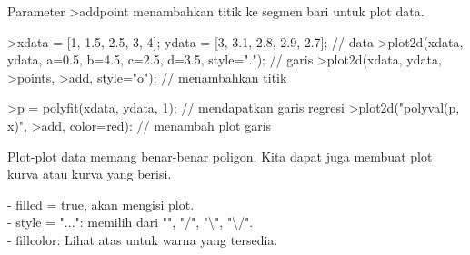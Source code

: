 \documentclass[a4paper,10pt]{article}
\begin{document}
\begin{eulernotebook}
\begin{eulercomment}
\begin{eulercomment}
\begin{eulercomment}
\begin{eulercomment}
\begin{eulercomment}
Parameter \textgreater{}addpoint menambahkan titik ke segmen bari untuk plot data.
\end{eulercomment}
\begin{eulerprompt}
>xdata = [1, 1.5, 2.5, 3, 4]; ydata = [3, 3.1, 2.8, 2.9, 2.7]; // data
>plot2d(xdata, ydata, a=0.5, b=4.5, c=2.5, d=3.5, style="."); // garis
>plot2d(xdata, ydata, >points, >add, style="o"): // menambahkan titik
\end{eulerprompt}
\begin{eulerprompt}
>p = polyfit(xdata, ydata, 1); // mendapatkan garis regresi
>plot2d("polyval(p, x)", >add, color=red): // menambah plot garis
\end{eulerprompt}
\begin{eulercomment}
Plot-plot data memang benar-benar poligon. Kita dapat juga membuat
plot kurva atau kurva yang berisi.

- filled = true, akan mengisi plot.\\
- style = "...": memilih dari "", "/", "\textbackslash{}", "\textbackslash{}/".\\
- fillcolor: Lihat atas untuk warna yang tersedia.


\end{eulercomment}
\end{eulercomment}
\end{eulercomment}
\end{eulercomment}
\end{eulercomment}
\end{eulernotebook}
\end{document}
